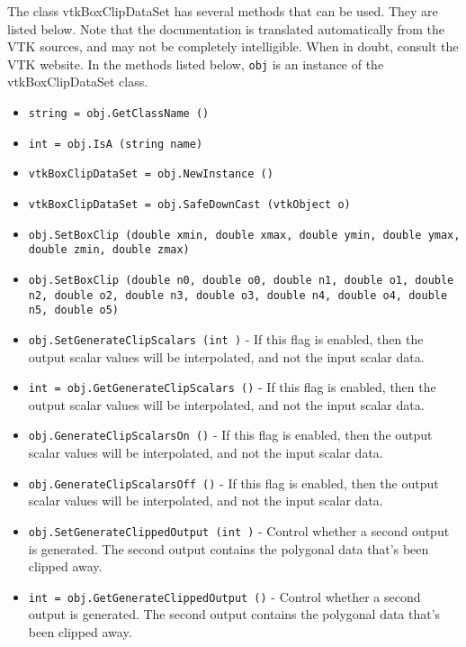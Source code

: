 The class vtkBoxClipDataSet has several methods that can be used.
  They are listed below.
Note that the documentation is translated automatically from the VTK sources,
and may not be completely intelligible.  When in doubt, consult the VTK website.
In the methods listed below, \verb|obj| is an instance of the vtkBoxClipDataSet class.
\begin{itemize}
\item  \verb|string = obj.GetClassName ()|

\item  \verb|int = obj.IsA (string name)|

\item  \verb|vtkBoxClipDataSet = obj.NewInstance ()|

\item  \verb|vtkBoxClipDataSet = obj.SafeDownCast (vtkObject o)|

\item  \verb|obj.SetBoxClip (double xmin, double xmax, double ymin, double ymax, double zmin, double zmax)|

\item  \verb|obj.SetBoxClip (double n0, double o0, double n1, double o1, double n2, double o2, double n3, double o3, double n4, double o4, double n5, double o5)|

\item  \verb|obj.SetGenerateClipScalars (int )| -  If this flag is enabled, then the output scalar values will be 
 interpolated, and not the input scalar data.

\item  \verb|int = obj.GetGenerateClipScalars ()| -  If this flag is enabled, then the output scalar values will be 
 interpolated, and not the input scalar data.

\item  \verb|obj.GenerateClipScalarsOn ()| -  If this flag is enabled, then the output scalar values will be 
 interpolated, and not the input scalar data.

\item  \verb|obj.GenerateClipScalarsOff ()| -  If this flag is enabled, then the output scalar values will be 
 interpolated, and not the input scalar data.

\item  \verb|obj.SetGenerateClippedOutput (int )| -  Control whether a second output is generated. The second output
 contains the polygonal data that's been clipped away.

\item  \verb|int = obj.GetGenerateClippedOutput ()| -  Control whether a second output is generated. The second output
 contains the polygonal data that's been clipped away.


\end{itemize}
